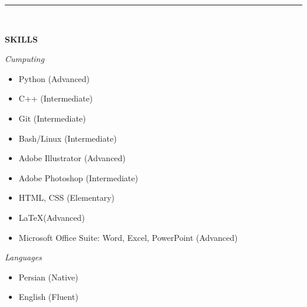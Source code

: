 \documentclass[11pt, b4paper]{cv}
\begin{document}
\vspace{-0.15in}
\rule{\textwidth}{1pt}\\
\vspace{-0.15in}

\textbf{SKILLS}


\textit{Cumputing}
\vspace{-0.1in}

\begin{multicols}{3}[]
	\begin{itemize}
	\setlength\itemsep{-0.5pt}
	  \item  Python (Advanced)
	  \item  C++ (Intermediate)
	  \item  Git (Intermediate)
	  \item  Bash/Linux (Intermediate)
	  \item  Adobe Illustrator (Advanced)
	  \item  Adobe Photoshop (Intermediate)
	  \item  HTML, CSS (Elementary)
	  \item  \LaTeX  (Advanced)
	  \item  Microsoft Office Suite: Word, Excel, PowerPoint (Advanced)
	\end{itemize}
\end{multicols}

\vspace{-0.1in}
\textit{Languages}
\vspace{-0.1in}

\begin{multicols}{3}[\columnsep=0cm]
	\begin{itemize}
	\setlength\itemsep{-1pt}
	  \item  Persian (Native)
	  \item  English (Fluent)
	\end{itemize}
\end{multicols}
\end{document}
